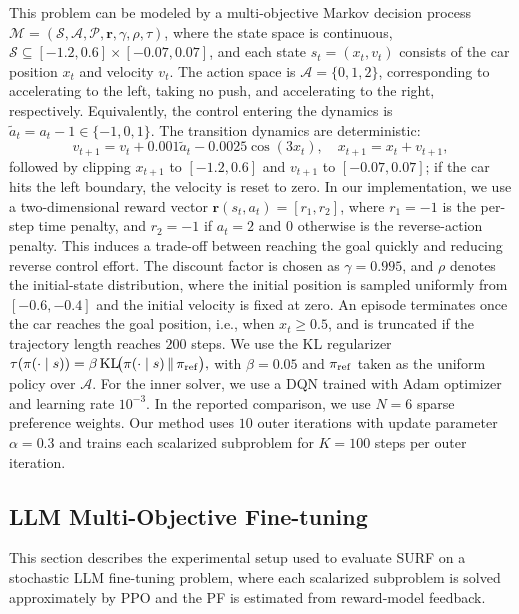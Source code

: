 \documentclass{article}
\begin{document}
This problem can be modeled by a multi-objective Markov decision process
$\mathcal{M}=(\mathcal{S},\mathcal{A},\mathcal{P},\mathbf{r},\gamma,\rho,\tau)$, where the state space is continuous,
$\mathcal{S}\subseteq [-1.2,0.6]\times[-0.07,0.07]$, and each state
$s_t=(x_t,v_t)$ consists of the car position $x_t$ and velocity $v_t$. The action space is
$\mathcal{A}=\{0,1,2\}$, corresponding to accelerating to the left, taking no push, and accelerating to the right, respectively. Equivalently, the control entering the dynamics is $\tilde a_t=a_t-1\in\{-1,0,1\}$. The transition dynamics are deterministic:
\begin{equation}
v_{t+1}=v_t+0.001 \tilde a_t-0.0025\cos(3x_t),
\quad
x_{t+1}=x_t+v_{t+1}, 
\end{equation}
followed by clipping $x_{t+1}$ to $[-1.2,0.6]$ and $v_{t+1}$ to $[-0.07,0.07]$; if the car hits the left boundary, the velocity is reset to zero. In our implementation, we use a two-dimensional reward vector
$\mathbf{r}(s_t,a_t)=[r_1,r_2]$,
where $r_1=-1$ is the per-step time penalty, and $r_2=-1$ if $a_t=2$ and $0$ otherwise is the reverse-action penalty.
This induces a trade-off between reaching the goal quickly and reducing reverse control effort. The discount factor is chosen as $\gamma=0.995$, and $\rho$ denotes the initial-state distribution, where the initial position is sampled uniformly from $[-0.6,-0.4]$ and the initial velocity is fixed at zero. An episode terminates once the car reaches the goal position, i.e., when $x_t\ge 0.5$, and is truncated if the trajectory length reaches $200$ steps. We use the KL 
regularizer
$
\tau(\pi(\cdot\mid s))=\beta\,\mathrm{KL}\!\bigl(\pi(\cdot\mid s)\,\|\,\pi_{\rm ref}\bigr),
$
with $\beta=0.05$ and $\pi_{\rm ref}$ taken as the uniform policy over $\mathcal{A}$. For the inner solver, we use a DQN trained with Adam optimizer and learning rate $10^{-3}$. In the reported comparison, we use $N=6$ sparse preference weights.
% 
Our method uses $10$ outer iterations with update parameter $\alpha=0.3$ and trains each scalarized subproblem for $K=100$ steps per outer iteration.



\subsection{LLM Multi-Objective Fine-tuning}
\label{app:llm_ft}

This section describes the experimental setup used to evaluate SURF on a stochastic LLM fine-tuning problem, where each scalarized subproblem is solved approximately by PPO and the PF is estimated from reward-model feedback.
\end{document}
